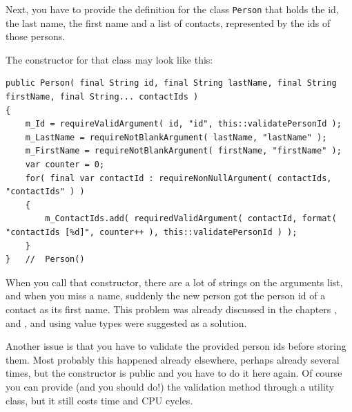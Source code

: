 Next, you have to provide the definition for the class \lstinline|Person| that holds the id, the last name, the first name and a list of contacts, represented by the ids of those persons.

The constructor for that class may look like this:
\begin{lstlisting}
public Person( final String id, final String lastName, final String firstName, final String... contactIds )
{
    m_Id = requireValidArgument( id, "id", this::validatePersonId );
    m_LastName = requireNotBlankArgument( lastName, "lastName" );
    m_FirstName = requireNotBlankArgument( firstName, "firstName" );
    var counter = 0;
    for( final var contactId : requireNonNullArgument( contactIds, "contactIds" ) )
    {
        m_ContactIds.add( requiredValidArgument( contactId, format( "contactIds [%d]", counter++ ), this::validatePersonId ) );
    }
}   //  Person()
\end{lstlisting}

When you call that constructor, there are a lot of strings on the arguments list, and when you miss a name, suddenly the new person got the person id of a contact as its first name. This problem was already discussed in the chapters ,  and , and using value types were suggested as a solution.

Another issue is that you have to validate the provided person ids before storing them. Most probably this happened already elsewhere, perhaps already several times, but the constructor is public and you have to do it here again. Of course you can provide (and you should do!) the validation method through a utility class, but it still costs time and CPU cycles.

